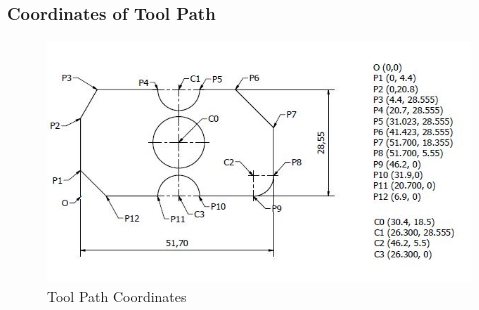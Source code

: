 \subsubsection{Coordinates of Tool Path}
\begin{center}
	\begin{figure}[!h]
	\centering
	\includegraphics{Figures/Coordinates}
	\caption[Tool Path Coordinates]{Tool Path Coordinates}
	\end{figure}
\end{center}
\newpage
